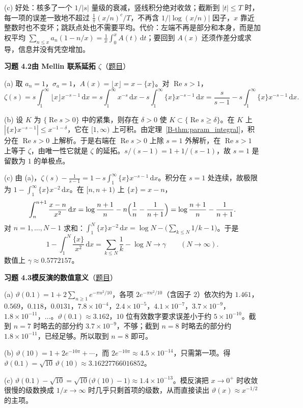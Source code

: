 \documentclass[11pt,a4paper]{article}
\newcommand{\dd}{\,\mathrm{d}}
\renewcommand{\Re}{\operatorname{Re}}
\newcommand{\bref}[1]{\ref*{B-#1}}
\newcommand{\Sol}[2]{%
  \par\addvspace{1.2em}\noindent
  \hypertarget{s:#1}{}\textbf{习题 #1\quad #2}\hfill{\small（\hyperlink{q:#1}{题目}）}\par
  \nopagebreak\smallskip}
\begin{document}
(c) 好处：核多了一个 $1/|s|$ 量级的衰减，竖线积分绝对收敛；截断到 $|t|\le T$ 时，每一项的误差一致地不超过 $\frac1\pi(x/n)^c/T$，不再含 $1/|\log(x/n)|$ 因子，$x$ 靠近整数时也不变坏；跳跃点处也不需要平均。代价：左端不再是部分和本身，而是加权平均 $\sum_{n\le x}a_n(1-n/x)=\frac1x\int_0^xA(t)\dd t$；要回到 $A(x)$ 还须作差分或求导，信息并没有凭空增加。

\Sol{4.2}{由 Mellin 联系延拓 $\zeta$}
(a) 取 $a_n=1$，$\sigma_a=1$，$A(x)=\lfloor x\rfloor=x-\{x\}$。对 $\Re s>1$，
\[
  \zeta(s)=s\int_1^\infty\lfloor x\rfloor x^{-s-1}\dd x=s\int_1^\infty x^{-s}\dd x-s\int_1^\infty\{x\}x^{-s-1}\dd x=\frac{s}{s-1}-s\int_1^\infty\{x\}x^{-s-1}\dd x .
\]

(b) 设 $K$ 为 $\{\Re s>0\}$ 中的紧集，则存在 $\delta>0$ 使 $K\subset\{\Re s\ge\delta\}$。在 $K$ 上 $|\{x\}x^{-s-1}|\le x^{-1-\delta}$，它在 $[1,\infty)$ 上可积。由定理~\bref{thm:param_integral}，积分在 $\Re s>0$ 上解析。于是右端在 $\Re s>0$ 上除 $s=1$ 外解析，在 $\Re s>1$ 上等于 $\zeta$，由唯一性它就是 $\zeta$ 的延拓。$s/(s-1)=1+1/(s-1)$，故 $s=1$ 是留数为 $1$ 的单极点。

(c) 由 (a)，$\zeta(s)-\frac1{s-1}=1-s\int_1^\infty\{x\}x^{-s-1}\dd x$。积分在 $s=1$ 处连续，故极限为 $1-\int_1^\infty\{x\}x^{-2}\dd x$。在 $[n,n+1)$ 上 $\{x\}=x-n$，
\[
  \int_n^{n+1}\frac{x-n}{x^2}\dd x=\log\frac{n+1}n-n\Bigl(\frac1n-\frac1{n+1}\Bigr)=\log\frac{n+1}n-\frac1{n+1}.
\]
对 $n=1,\dots,N-1$ 求和：$\int_1^N\{x\}x^{-2}\dd x=\log N-\bigl(\sum_{k\le N}1/k-1\bigr)$。于是
\[
  1-\int_1^N\frac{\{x\}}{x^2}\dd x=\sum_{k\le N}\frac1k-\log N\longrightarrow\gamma\qquad(N\to\infty).
\]
数值上 $\gamma\approx0.5772157$。

\Sol{4.3}{模反演的数值意义}
(a) $\vartheta(0.1)=1+2\sum_{n\ge1}e^{-\pi n^2/10}$，各项 $2e^{-\pi n^2/10}$（含因子 $2$）依次约为 $1.461$，$0.569$，$0.118$，$0.0131$，$7.8\times10^{-4}$，$2.4\times10^{-5}$，$4.1\times10^{-7}$，$3.7\times10^{-9}$，$1.8\times10^{-11}$，$\dots$。$\vartheta(0.1)\approx3.162$，$10$ 位有效数字要求误差小于约 $5\times10^{-10}$。截到 $n=7$ 时略去的部分约 $3.7\times10^{-9}$，不够；截到 $n=8$ 时略去的部分约 $1.8\times10^{-11}$，已经足够。所以取到 $n=8$ 即可。

(b) $\vartheta(10)=1+2e^{-10\pi}+\cdots$，而 $2e^{-10\pi}\approx4.5\times10^{-14}$，只需第一项。得
$\vartheta(0.1)=\sqrt{10}\,\vartheta(10)\approx3.16227766016852$。

(c) $\vartheta(0.1)-\sqrt{10}=\sqrt{10}\bigl(\vartheta(10)-1\bigr)\approx1.4\times10^{-13}$。模反演把 $x\to0^+$ 时收敛很慢的级数换成 $1/x\to\infty$ 时几乎只剩首项的级数，从而直接读出 $\vartheta(x)\approx x^{-1/2}$ 的主项。
\end{document}
